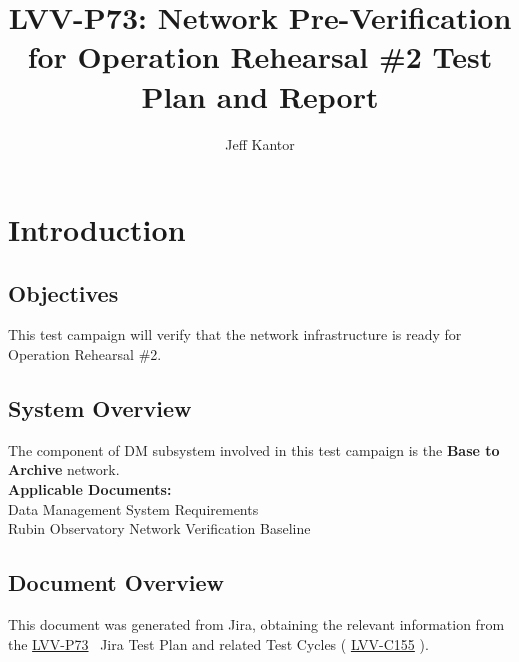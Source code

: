 \documentclass[DM,lsstdraft,STR,toc]{lsstdoc}
\begin{document}
\def\milestoneName{Network Pre-Verification for Operation Rehearsal \#2}
\def\milestoneId{LVV-P73}
\def\product{Data Management}


\title{LVV-P73: Network Pre-Verification for Operation Rehearsal \#2 Test Plan and Report}
\setDocRef{\lsstDocType-\lsstDocNum}
\date{\vcsdate}
\author{ Jeff Kantor }






\maketitle

\section{Introduction}
\label{sect:intro}


\subsection{Objectives}
\label{sect:objectives}

 This test campaign will verify that the network infrastructure is ready
for Operation Rehearsal \#2.



\subsection{System Overview}
\label{sect:systemoverview}

 The component of DM subsystem involved in this test campaign is the
\textbf{Base to Archive} network.\\[2\baselineskip]\textbf{Applicable
Documents:}\\[2\baselineskip] Data Management System
Requirements\\
 Rubin Observatory Network Verification Baseline


\subsection{Document Overview}
\label{sect:docoverview}

This document was generated from Jira, obtaining the relevant information from the
\href{https://jira.lsstcorp.org/secure/Tests.jspa\#/testPlan/LVV-P73}{LVV-P73}
~Jira Test Plan and related Test Cycles (
\href{https://jira.lsstcorp.org/secure/Tests.jspa\#/testCycle/LVV-C155}{LVV-C155}
).
\end{document}

